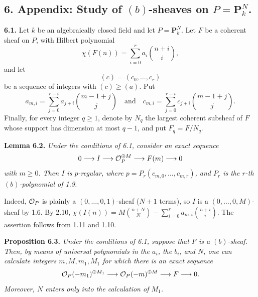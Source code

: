 
\subsection*{6. Appendix: Study of $(b)$-sheaves on $P=\mathbf P^N_k$.}

\textbf{6.1.} Let $k$ be an algebraically closed field and let $P=\mathbf P^N_k$. Let $F$ be a coherent sheaf on $P$, with Hilbert polynomial
\[
  \chi(F(n))=\sum_{i=0}^{r}a_i\binom{n+i}{i},
\]
and let
\[
  (c)=(c_0,\ldots,c_r)
\]
be a sequence of integers with $(c)\geq(a)$. Put
\[
  a_{m,i}=\sum_{j=0}^{r-i}a_{j+i}\binom{m-1+j}{j}
  \quad\text{and}\quad
  c_{m,i}=\sum_{j=0}^{r-i}c_{j+i}\binom{m-1+j}{j}.
\]
Finally, for every integer $q\geq1$, denote by $N_q$ the largest coherent subsheaf of $F$ whose support has dimension at most $q-1$, and put $F_q=F/N_q$.

\textbf{Lemma 6.2.} \emph{Under the conditions of 6.1, consider an exact sequence
\[
  0\longrightarrow I\longrightarrow\mathcal O_P^{\oplus M}
  \longrightarrow F(m)\longrightarrow0
\]
with $m\geq0$. Then $I$ is $p$-regular, where
\(p=P_r(c_{m,0},\ldots,c_{m,r})\), and $P_r$ is the $r$-th
$(b)$-polynomial of 1.9.}

Indeed, $\mathcal O_P$ is plainly a $(0,\ldots,0,1)$-sheaf ($N+1$ terms), so
$I$ is a $(0,\ldots,0,M)$-sheaf by 1.6. By 2.10,
\(\chi(I(n))=M\binom{n+N}{N}
-\sum_{i=0}^{r}a_{m,i}\binom{n+i}{i}\). The assertion follows from
1.11 and 1.10.

\textbf{Proposition 6.3.} \emph{Under the conditions of 6.1, suppose that $F$ is a $(b)$-sheaf. Then, by means of universal polynomials in the $a_i$, the $b_i$, and $N$, one can calculate integers $m,M,m_1,M_1$ for which there is an exact sequence
\[
  \mathcal O_P(-m_1)^{\oplus M_1}\longrightarrow
  \mathcal O_P(-m)^{\oplus M}\longrightarrow F\longrightarrow0.
\]
Moreover, $N$ enters only into the calculation of $M_1$.}

